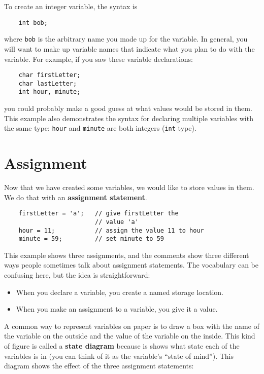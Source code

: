 To create an integer variable, the syntax is 

\begin{verbatim}    
    int bob;
\end{verbatim}

%
where {\tt bob} is the arbitrary name you made up for the
variable.  In general, you will want to make up variable names
that indicate what you plan to do with the variable.  For
example, if you saw these variable declarations:

\begin{lstlisting}
    char firstLetter;
    char lastLetter;
    int hour, minute;
\end{lstlisting}
%
you could probably make a good guess at what values
would be stored in them.  This example
also demonstrates the syntax for declaring multiple variables
with the same type: {\tt hour} and {\tt minute}
are both integers ({\tt int} type).

\section{Assignment}

Now that we have created some variables, we would like to
store values in them.  We do that with an {\bf assignment
statement}.


\begin{lstlisting}
    firstLetter = 'a';   // give firstLetter the 
                         // value 'a'
    hour = 11;           // assign the value 11 to hour
    minute = 59;         // set minute to 59
\end{lstlisting}
%
This example shows three assignments, and the comments show
three different ways people sometimes talk about assignment
statements.  The vocabulary can be confusing here, but the
idea is straightforward:

\begin{itemize}

\item When you declare a variable, you create a named storage location.

\item When you make an assignment to a variable, you give it a value.

\end{itemize}

A common way to represent variables on paper is to draw a box
with the name of the variable on the outside and the value
of the variable on the inside.  This kind of figure is called
a {\bf state diagram} because is shows what state each of the
variables is in (you can think of it as the variable's ``state of
mind'').
This diagram shows
the effect of the three assignment statements:

